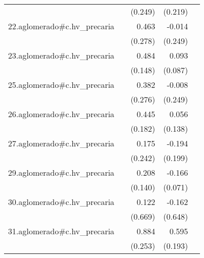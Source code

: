 {\begin{longtable}{l*{4}{D{.}{.}{-1}}}
            &                     &     (0.249)         &     (0.219)         &                     \\
\addlinespace
22.aglomerado#c.hv\_precaria&                     &       0.463         &      -0.014         &                     \\
            &                     &     (0.278)         &     (0.249)         &                     \\
\addlinespace
23.aglomerado#c.hv\_precaria&                     &       0.484\sym{**} &       0.093         &                     \\
            &                     &     (0.148)         &     (0.087)         &                     \\
\addlinespace
25.aglomerado#c.hv\_precaria&                     &       0.382         &      -0.008         &                     \\
            &                     &     (0.276)         &     (0.249)         &                     \\
\addlinespace
26.aglomerado#c.hv\_precaria&                     &       0.445\sym{*}  &       0.056         &                     \\
            &                     &     (0.182)         &     (0.138)         &                     \\
\addlinespace
27.aglomerado#c.hv\_precaria&                     &       0.175         &      -0.194         &                     \\
            &                     &     (0.242)         &     (0.199)         &                     \\
\addlinespace
29.aglomerado#c.hv\_precaria&                     &       0.208         &      -0.166\sym{*}  &                     \\
            &                     &     (0.140)         &     (0.071)         &                     \\
\addlinespace
30.aglomerado#c.hv\_precaria&                     &       0.122         &      -0.162         &                     \\
            &                     &     (0.669)         &     (0.648)         &                     \\
\addlinespace
31.aglomerado#c.hv\_precaria&                     &       0.884\sym{***}&       0.595\sym{**} &                     \\
            &                     &     (0.253)         &     (0.193)         &                     \\

\end{longtable}}
